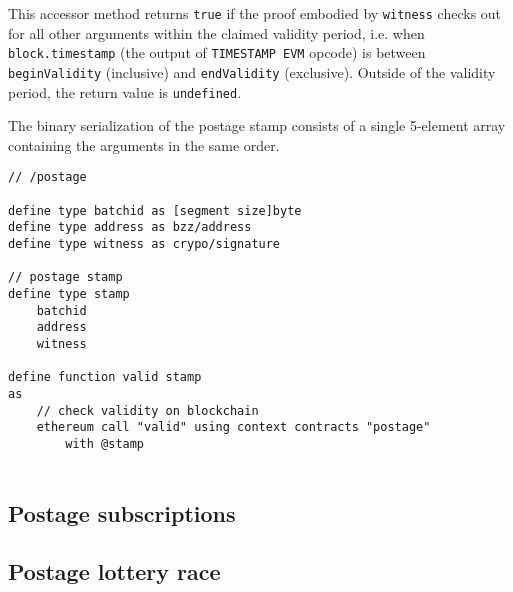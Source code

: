 This accessor method returns \lstinline{true} if the proof embodied by \lstinline{witness} checks out for all other arguments within the claimed 
validity period, i.e. when \lstinline{block.timestamp} (the output of \lstinline{TIMESTAMP EVM} opcode) is between \lstinline{beginValidity} (inclusive) and 
\lstinline{endValidity} (exclusive). Outside of the validity period, the return value is \lstinline{undefined}.

The binary serialization of the postage stamp consists of a single 5-element array containing the arguments in the same order. 



\begin{definition}\label{def:postage-stamp}
\begin{lstlisting}[language=buzz1]
// /postage

define type batchid as [segment size]byte  
define type address as bzz/address
define type witness as crypo/signature

// postage stamp
define type stamp  
    batchid
    address
    witness

define function valid stamp
as 
    // check validity on blockchain
    ethereum call "valid" using context contracts "postage"
        with @stamp
        
\end{lstlisting}
\end{definition}

\subsection{Postage subscriptions}\label{spec:format:subscriptions}

\subsection{Postage lottery race}\label{spec:format:race}